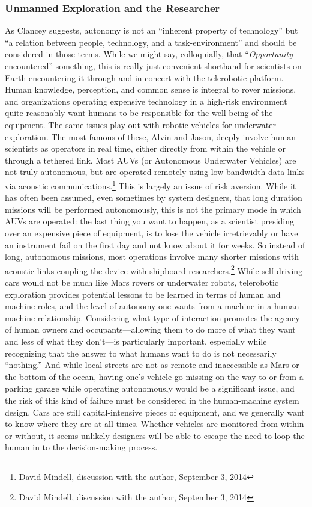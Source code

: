 \subsubsection{Unmanned Exploration and the Researcher}

As Clancey suggests, autonomy is not an ``inherent property of
technology'' but ``a relation between people, technology, and a
task-environment'' and should be considered in those terms\cite[p.
  119]{???-clancey}. While we might say, colloquially, that
``\emph{Opportunity} encountered'' something,\cite[p. 8]{???-clancey} this
is really just convenient shorthand for scientists on Earth encountering it
through and in concert with the telerobotic platform. Human knowledge,
perception, and common sense is integral to rover missions, and
organizations operating expensive 
technology in a high-risk environment quite reasonably want humans to
be responsible
for the well-being of the equipment. The same issues play out with
robotic vehicles for underwater exploration. The most famous of these,
Alvin and Jason, deeply involve human scientists as operators in real
time, either directly from within the vehicle or through a tethered
link.\cite{???} Most AUVs (or Autonomous Underwater Vehicles) are not
truly autonomous, but are operated remotely using low-bandwidth data
links via acoustic communications.\footnote{David Mindell, discussion
  with the author, September 3, 2014} This is largely an issue of risk
aversion. While it has often been assumed, even sometimes by system
designers, that long duration missions will be performed autonomously,
this is not the primary mode in which AUVs are operated: the last
thing you want to happen, as a scientist presiding over an expensive
piece of equipment, is to lose the vehicle irretrievably or have an
instrument fail on the first day and not know about it for weeks. So
instead of long, autonomous missions, most operations involve many
shorter missions with acoustic links coupling the device with
shipboard researchers.\footnote{David Mindell, discussion with the
  author, September 3, 2014} While self-driving cars would not
be much like Mars rovers or underwater robots, telerobotic exploration
provides potential lessons
to be learned in terms of human and machine roles, and the level of
autonomy one wants from a machine in a human-machine relationship.
Considering what type of interaction promotes the agency
of human owners and occupants---allowing them to do more of what they
want and less of what they don't---is particularly important,
especially while recognizing that the answer to what humans want to do
is not necessarily ``nothing.'' And while local streets are not as
remote and inaccessible as Mars or the bottom of the ocean, having
one's vehicle go missing on the way to or from a parking garage while
operating autonomously would be a significant issue, and the risk of
this kind of failure must be considered in the human-machine system
design. Cars are still capital-intensive pieces of equipment, and we
generally want to know where they are at all times. Whether vehicles
are monitored
from within or without, it seems unlikely designers will be able to
escape the need to loop the human in to the decision-making process.

